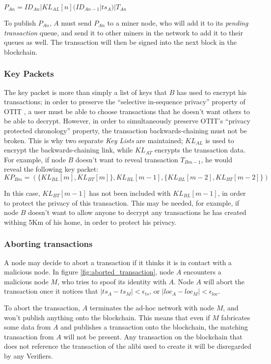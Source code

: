 \documentclass[12pt]{article}
\begin{document}
$P_{An} = ID_{An}|KL_{AL}[n](ID_{An-1}|ts_A)|T_{An}$

\null
To publish $P_{An}$, $A$ must send $P_{An}$ to a miner node, who will add it to its \textit{pending transaction} queue, and send it to other miners in the network to add it to their queues as well. The transaction will then be signed into the next block in the blockchain.

\subsubsection{Key Packets} \label{sssec:key_packets}
The key packet is more than simply a list of keys that $B$ has used to encrypt his transactions; in order to preserve the ``selective in-sequence privacy'' property of OTIT \cite{otit}, a user must be able to choose transactions that he doesn't want others to be able to decrypt. However, in order to simultaneously preserve OTIT's ``privacy protected chronology'' property, the transaction backwards-chaining must not be broken. This is why two separate \textit{Key Lists} are maintained; $KL_{AL}$ is used to encrypt the backwards-chaining link, while $KL_{AT}$ encrypts the transaction data. For example, if node $B$ doesn't want to reveal transaction $T_{Bm-1}$, he would reveal the following key packet:
\\

${KP_{Bm} = (\{KL_{BL}[m], KL_{BT}[m]\}, KL_{BL}[m-1], \{KL_{BL}[m-2], KL_{BT}[m-2]\})}$

\null
In this case, $KL_{BT}[m-1]$ has not been included with $KL_{BL}[m-1]$, in order to protect the privacy of this transaction. This may be needed, for example, if node $B$ doesn't want to allow anyone to decrypt any transactions he has created withing 5Km of his home, in order to protect his privacy.

\subsubsection{Aborting transactions}
A node may decide to abort a transaction if it thinks it is in contact with a malicious node. In figure \ref{fig:aborted_transaction}, node $A$ encounters a malicious node $M$, who tries to spoof its identity with $A$. Node $A$ will abort the transaction once it notices that $|ts_A-ts_M| < \epsilon_{ts}$, or $|loc_A-loc_M| < \epsilon_{loc}$.

To abort the transaction, $A$ terminates the ad-hoc network with node $M$, and won't publish anything onto the blockchain. This means that even if $M$ fabricates some data from $A$ and publishes a transaction onto the blockchain, the matching transaction from $A$ will not be present. Any transaction on the blockchain that does not reference the transaction of the alibi used to create it will be disregarded by any Verifiers.
\end{document}
